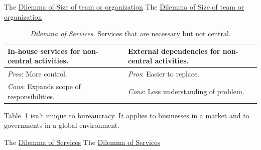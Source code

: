 The \href{table:staff_many-vs-few}{Dilemma of Size of team or organization}
The \href{table:staff_many-vs-few}{Dilemma of Size of team or organization}


\begin{center}
\begin{table}[H] %
\begin{tabular}{ | m{\dilemmatablewidth}| m{\dilemmatablewidth} | } 
  \hline
  \textbf{In-house services for non-central activities.} &
  \textbf{External dependencies for non-central activities.} \\
  \hline
  \textit{Pros}: More control. &
  \textit{Pros}: Easier to replace. \\
  \hline
  \textit{Cons}: Expands scope of responsibilities. & 
  \textit{Cons}: Less understanding of problem.  \\
  \hline
\end{tabular}
\caption{
\textit{Dilemma of Services.}
Services that are necessary but not central.
}
\label{table:inhouse-vs-external}
\end{table}
\end{center}

Table~\ref{table:inhouse-vs-external} isn't unique to bureaucracy. It applies to businesses in a market and to governments in a global environment. 


The \href{table:inhouse-vs-external}{Dilemma of Services}
The \href{table:inhouse-vs-external}{Dilemma of Services}


